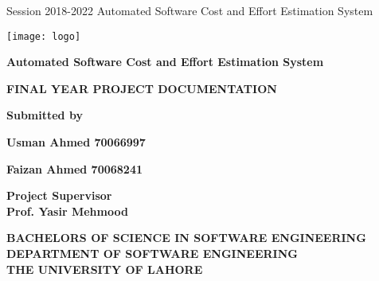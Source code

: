 \documentclass{article}
\begin{document}
	
	\begin{center}

		Session 2018-2022
		\hfill
		Automated Software Cost and Effort Estimation System

		\vspace{10mm}

		\texttt{[image: logo]} \\

		\vspace{10mm}
		
		\Huge{\textbf{Automated Software Cost and Effort Estimation System}} \\
		
		\vspace{10mm}
		
		\huge{\textbf{FINAL YEAR PROJECT DOCUMENTATION}} \\
		
		\vspace{25mm}
		
		\Large{\textbf{Submitted by}} \\
		
		\vspace{15mm}
		
		\Large{\textbf{Usman Ahmed \hspace{3cm} 70066997}}
		
		\vspace{1mm}
		
		\Large{\textbf{Faizan Ahmed \hspace{3cm} 70068241}}

		\vspace{10mm}

		\Large{\textbf{Project Supervisor}} \\
		\vspace{3mm}
		\Large{\textbf{Prof. Yasir Mehmood}}

		\vspace{15mm}


		\Large{\textbf{BACHELORS OF SCIENCE IN SOFTWARE ENGINEERING}} \\
		\vspace{10mm}
		\Large{\textbf{DEPARTMENT OF SOFTWARE ENGINEERING}} \\
		\vspace{3mm}
		\Large{\textbf{THE UNIVERSITY OF LAHORE}} \\
		

		
		

		
	\end{center}
\end{document}
